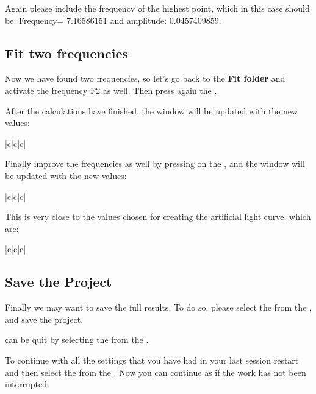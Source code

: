 Again please include the frequency of the highest point, which in this case
should be: Frequency= 7.16586151 and amplitude: 0.0457409859.

\subsection{Fit two frequencies}

Now we have found two frequencies, so let's go back to the 
{\bf Fit folder} and activate the frequency F2 as well.
Then press again the .

After the calculations have finished,
the window will be updated with the new values:

\begin{tabular}{|c|c|c|}\hline
{}\hline
{}
\hline\hline
{}
\end{tabular}

Finally improve the frequencies as well
by pressing on the ,
and the window will be updated with
the new values:

\begin{tabular}{|c|c|c|}\hline
{}\hline
{}
\hline\hline
{}
\end{tabular}

This is very close to the values chosen for creating
the artificial light curve, which are:

\begin{tabular}{|c|c|c|}\hline
{}\hline
{}
\hline\hline
{}
\end{tabular}

\subsection{Save the Project}

Finally we may want to save the full results.
To do so, please select the  from the 
, and save the project.

\period can be quit by selecting the  from the 
.

To continue with all the settings that you have had in your last session
restart \period and then select the  
from the . Now you can continue as if the work has
not been interrupted.

